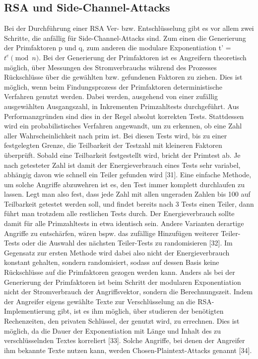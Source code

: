 \documentclass[conference,10pt,a4paper,twocolumn]{IEEEtran}
\begin{document}
\subsection{RSA und Side-Channel-Attacks}
Bei der Durchführung einer RSA Ver- bzw. Entschlüsselung gibt es vor allem zwei Schritte, die anfällig für Side-Channel-Attacks sind. Zum einen die Generierung der Primfaktoren p und q, zum anderen die modulare Exponentiation t' = \begin{math} t^e \pmod n \end{math}. Bei der Generierung der Primfaktoren ist es Angreifern theoretisch möglich, über Messungen des Stromverbrauchs während des Prozesses Rückschlüsse über die gewählten bzw. gefundenen Faktoren zu ziehen. Dies ist möglich, wenn beim Findungsprozess der Primfaktoren deterministische Verfahren genutzt werden. Dabei werden, ausgehend von einer zufällig ausgewählten Ausgangszahl, in Inkrementen Primzahltests durchgeführt. Aus Performanzgründen sind dies in der Regel absolut korrekten Tests. Stattdessen wird ein probabilistisches Verfahren angewandt, um zu erkennen, ob eine Zahl aller Wahrscheinlichkeit nach prim ist. Bei diesen Tests wird, bis zu einer festgelegten Grenze, die Teilbarkeit der Testzahl mit kleineren Faktoren überprüft. Sobald eine Teilbarkeit festgestellt wird, bricht der Primtest ab. Je nach getesteter Zahl ist damit der Energieverbrauch eines Tests sehr variabel, abhängig davon wie schnell ein Teiler gefunden wird [31]. Eine einfache Methode, um solche Angriffe abzuwehren ist es, den Test immer komplett durchlaufen zu lassen. Legt man also fest, dass jede Zahl mit allen ungeraden Zahlen bis 100 auf Teilbarkeit getestet werden soll, und findet bereits nach 3 Tests einen Teiler, dann führt man trotzdem alle restlichen Tests durch. \linebreak Der Energieverbrauch sollte damit für alle Primzahltests in etwa identisch sein. Andere Varianten derartige Angriffe zu entschärfen, wären bspw. das zufällige Hinzufügen weiterer Teiler-Tests oder die Auswahl des nächsten Teiler-Tests zu randomisieren [32]. Im Gegensatz zur ersten Methode wird dabei also nicht der Energieverbrauch konstant gehalten, sondern randomisiert, sodass auf dessen Basis keine Rückschlüsse auf die Primfaktoren gezogen werden kann.
\newline
Anders als bei der Generierung der Primfaktoren ist beim Schritt der modularen Exponentiation nicht der Stromverbrauch der Angriffsvektor, sondern die Berechnungszeit. Indem der Angreifer eigens gewählte Texte zur Verschlüsselung an die RSA-Implementierung gibt, ist es ihm möglich, über studieren der benötigten Rechenzeiten, den privaten Schlüssel, der genutzt wird, zu errechnen. Dies ist möglich, da die Dauer der Exponentiation mit Länge und Inhalt des zu verschlüsselnden Textes korreliert [33]. Solche Angriffe, bei denen der Angreifer ihm bekannte Texte nutzen kann, werden Chosen-Plaintext-Attacks genannt [34].
\end{document}
